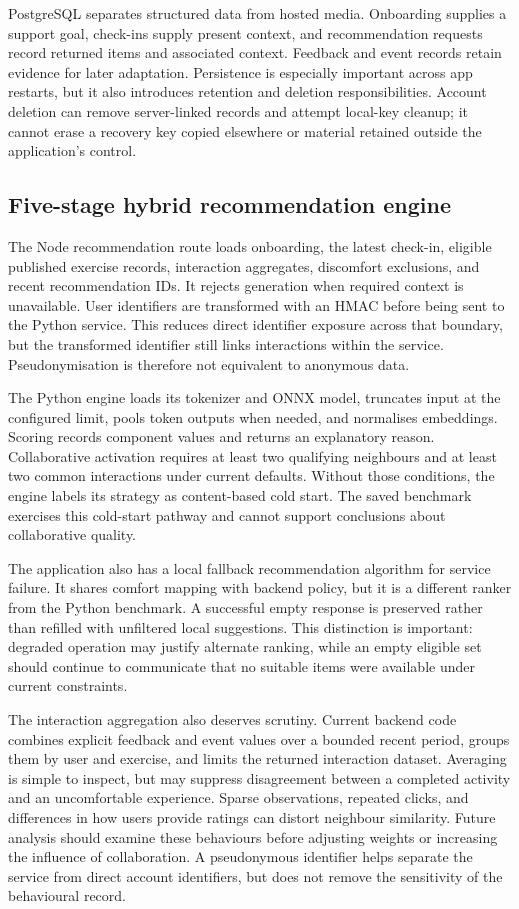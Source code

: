 PostgreSQL separates structured data from hosted media. Onboarding supplies a support goal, check-ins supply present context, and recommendation requests record returned items and associated context. Feedback and event records retain evidence for later adaptation. Persistence is especially important across app restarts, but it also introduces retention and deletion responsibilities. Account deletion can remove server-linked records and attempt local-key cleanup; it cannot erase a recovery key copied elsewhere or material retained outside the application's control.

\subsection{Five-stage hybrid recommendation engine}

The Node recommendation route loads onboarding, the latest check-in, eligible published exercise records, interaction aggregates, discomfort exclusions, and recent recommendation IDs. It rejects generation when required context is unavailable. User identifiers are transformed with an HMAC before being sent to the Python service. This reduces direct identifier exposure across that boundary, but the transformed identifier still links interactions within the service. Pseudonymisation is therefore not equivalent to anonymous data.

The Python engine loads its tokenizer and ONNX model, truncates input at the configured limit, pools token outputs when needed, and normalises embeddings. Scoring records component values and returns an explanatory reason. Collaborative activation requires at least two qualifying neighbours and at least two common interactions under current defaults. Without those conditions, the engine labels its strategy as content-based cold start. The saved benchmark exercises this cold-start pathway and cannot support conclusions about collaborative quality.

The application also has a local fallback recommendation algorithm for service failure. It shares comfort mapping with backend policy, but it is a different ranker from the Python benchmark. A successful empty response is preserved rather than refilled with unfiltered local suggestions. This distinction is important: degraded operation may justify alternate ranking, while an empty eligible set should continue to communicate that no suitable items were available under current constraints.

The interaction aggregation also deserves scrutiny. Current backend code combines explicit feedback and event values over a bounded recent period, groups them by user and exercise, and limits the returned interaction dataset. Averaging is simple to inspect, but may suppress disagreement between a completed activity and an uncomfortable experience. Sparse observations, repeated clicks, and differences in how users provide ratings can distort neighbour similarity. Future analysis should examine these behaviours before adjusting weights or increasing the influence of collaboration. A pseudonymous identifier helps separate the service from direct account identifiers, but does not remove the sensitivity of the behavioural record.

